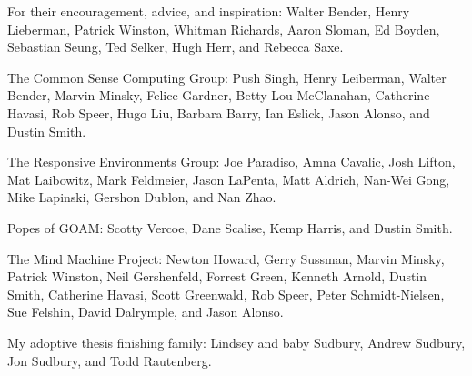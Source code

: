 \vspace{5mm}

\noindent For their encouragement, advice, and inspiration:
Walter Bender,
Henry Lieberman,
Patrick Winston,
Whitman Richards,
Aaron Sloman,
Ed Boyden,
Sebastian Seung,
Ted Selker,
Hugh Herr, and
Rebecca Saxe.

\vspace{5mm}

\noindent The Common Sense Computing Group:
Push Singh,
Henry Leiberman,
Walter Bender,
Marvin Minsky,
Felice Gardner,
Betty Lou McClanahan,
Catherine Havasi,
Rob Speer,
Hugo Liu,
Barbara Barry,
Ian Eslick,
Jason Alonso, and
Dustin Smith.

\vspace{5mm}

\noindent The Responsive Environments Group:
Joe Paradiso,
Amna Cavalic,
Josh Lifton, %
Mat Laibowitz, %
Mark Feldmeier, %
Jason LaPenta,
Matt Aldrich, %
Nan-Wei Gong, %
Mike Lapinski, %
Gershon Dublon,
and Nan Zhao. %

\vspace{5mm}

\noindent Popes of GOAM:
Scotty Vercoe,
Dane Scalise,
Kemp Harris, and
Dustin Smith.

\vspace{5mm}

\noindent The Mind Machine Project:
Newton Howard, Gerry Sussman, Marvin Minsky, Patrick Winston, Neil Gershenfeld, Forrest Green, Kenneth Arnold, Dustin Smith, Catherine Havasi, Scott Greenwald, Rob Speer, Peter Schmidt-Nielsen, Sue Felshin, David Dalrymple, and Jason Alonso.

\vspace{5mm}

\noindent My adoptive thesis finishing family:
Lindsey and baby Sudbury, Andrew Sudbury, Jon Sudbury, and Todd Rautenberg.

\vspace{5mm}


